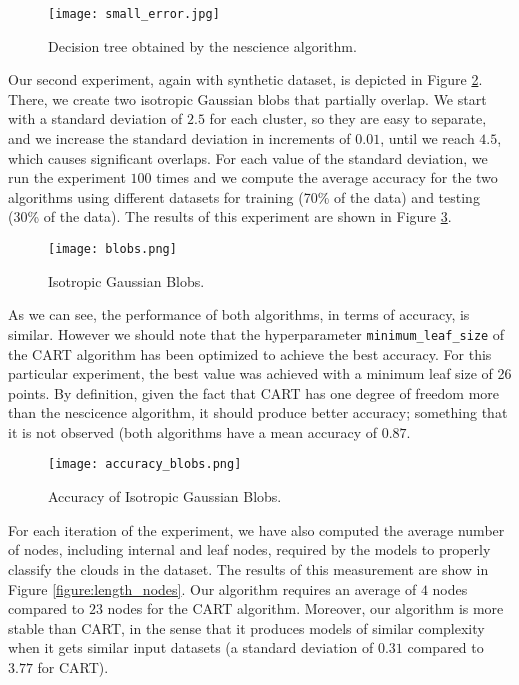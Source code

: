 \begin{figure}[h]
\centering
\texttt{[image: small\_error.jpg]}
\caption{Decision tree obtained by the nescience algorithm.}
\label{figure:data_error_nes}
\end{figure}

Our second experiment, again with synthetic dataset, is depicted in Figure \ref{figure:blobs}. There, we create two isotropic Gaussian blobs that partially overlap. We start with a standard deviation of $2.5$ for each cluster, so they are easy to separate, and we increase the standard deviation in increments of $0.01$, until we reach $4.5$, which causes significant overlaps. For each value of the standard deviation, we run the experiment $100$ times and we compute the average accuracy for the two algorithms using different datasets for training (70\% of the data) and testing (30\% of the data). The results of this experiment are shown in Figure \ref{figure:accuracy_blobs}.

\begin{figure}[h]
\centering
\texttt{[image: blobs.png]}
\caption{Isotropic Gaussian Blobs.}
\label{figure:blobs}
\end{figure}

As we can see, the performance of both algorithms, in terms of accuracy, is similar. However we should note that the hyperparameter \texttt{minimum\_leaf\_size} of the CART algorithm has been optimized to achieve the best accuracy. For this particular experiment, the best value was achieved with a minimum leaf size of 26 points. By definition, given the fact that CART has one degree of freedom more than the nescicence algorithm, it should produce better accuracy; something that it is not observed (both algorithms have a mean accuracy of $0.87$.

\begin{figure}[h]
\centering
\texttt{[image: accuracy\_blobs.png]}
\caption{Accuracy of Isotropic Gaussian Blobs.}
\label{figure:accuracy_blobs}
\end{figure}

For each iteration of the experiment, we have also computed the average number of nodes, including internal and leaf nodes, required by the models to properly classify the clouds in the dataset. The results of this measurement are show in Figure \ref{figure:length_nodes}. Our algorithm requires an average of $4$ nodes compared to $23$ nodes for the CART algorithm. Moreover, our algorithm is more stable than CART, in the sense that it produces models of similar complexity when it gets similar input datasets (a standard deviation of $0.31$ compared to $3.77$ for CART).

